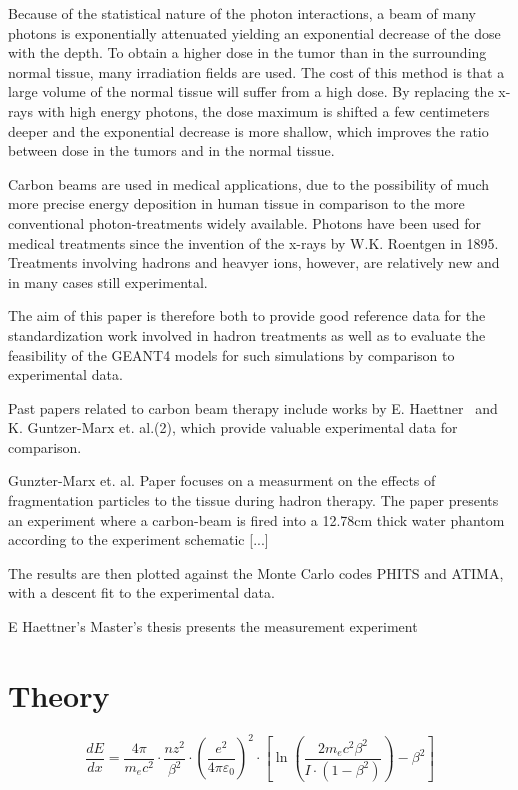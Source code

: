 Because of the statistical nature of the photon interactions, a beam of many photons is
exponentially attenuated yielding an exponential decrease of the dose with the depth. To
obtain a higher dose in the tumor than in the surrounding normal tissue, many irradiation
fields are used. The cost of this method is that a large volume of the normal tissue
will suffer from a high dose. By replacing the x-rays with high energy photons, the dose
maximum is shifted a few centimeters deeper and the exponential decrease is more shallow,
which improves the ratio between dose in the tumors and in the normal tissue.

Carbon beams are used in medical applications, due to the possibility of much more precise energy deposition in human tissue in comparison to the more conventional photon-treatments widely available. Photons have been used for medical treatments since the invention of the x-rays by W.K. Roentgen in 1895. Treatments involving hadrons and heavyer ions, however, are relatively new and in many cases still experimental.

The aim of this paper is therefore both to provide good reference data for the standardization work involved in hadron treatments as well as to evaluate the feasibility of the GEANT4 models for such simulations by comparison to experimental data.

Past papers related to carbon beam therapy include  works by E. Haettner~\cite{ehaettner} and K. Guntzer-Marx et. al.(2), which provide valuable experimental data for comparison.

Gunzter-Marx et. al. Paper focuses on a measurment on the effects of fragmentation particles to the tissue during hadron therapy. The paper presents an experiment where a carbon-beam is fired into a 12.78cm thick water phantom according to the experiment schematic [...]

The results are then plotted against the Monte Carlo codes PHITS and ATIMA, with a descent fit to the experimental data.

E Haettner's Master's thesis presents the measurement experiment 
\section{Theory}
\begin{equation}
 \frac{dE}{dx} = \frac{4 \pi}{m_e c^2} \cdot \frac{nz^2}{\beta^2} \cdot \left(\frac{e^2}{4\pi\varepsilon_0}\right)^2 \cdot \left[\ln \left(\frac{2m_e c^2 \beta^2}{I \cdot (1-\beta^2)}\right) - \beta^2\right]
\label{bethebloch}
\end{equation}


